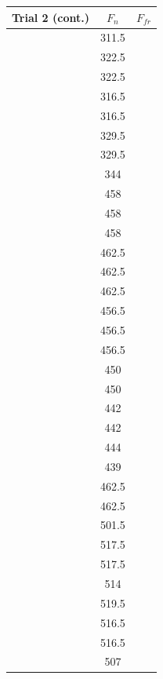 \documentclass[12pt]{article}
\begin{document}
\begin{table}
\begin{tabular}[t]{| c  c  c |}
        \hline
        Trial 2 (cont.) & $F_{n}$       & $F_{fr}$  \\
        \hline
                & 311.5         &           \\
                & 322.5         &           \\
                & 322.5         &           \\
                & 316.5         &           \\
                & 316.5         &           \\
                & 329.5         &           \\
                & 329.5         &           \\
                & 344           &           \\
                & 458           &           \\
                & 458           &           \\
                & 458           &           \\
                & 462.5         &           \\
                & 462.5         &           \\
                & 462.5         &           \\
                & 456.5         &           \\
                & 456.5         &           \\
                & 456.5         &           \\
                & 450           &           \\
                & 450           &           \\
                & 442           &           \\
                & 442           &           \\
                & 444           &           \\
                & 439           &           \\
                & 462.5         &           \\
                & 462.5         &           \\
                & 501.5         &           \\
                & 517.5         &           \\
                & 517.5         &           \\
                & 514           &           \\
                & 519.5         &           \\
                & 516.5         &           \\
                & 516.5         &           \\
                & 507           &           \\
        \hline
    \end{tabular}
\end{table}
\end{document}
